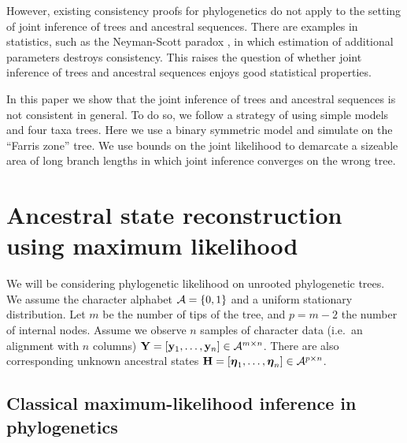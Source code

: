 \documentclass[a4paper]{article}
\begin{document}
However, existing consistency proofs for phylogenetics \cite{RoyChoudhury2015-ta} do not apply to the setting of joint inference of trees and ancestral sequences.
There are examples in statistics, such as the Neyman-Scott paradox \cite{Neyman1948-tt}, in which estimation of additional parameters destroys consistency.
This raises the question of whether joint inference of trees and ancestral sequences enjoys good statistical properties.

In this paper we show that the joint inference of trees and ancestral sequences is not consistent in general.
To do so, we follow a strategy of using simple models and four taxa trees.
Here we use a binary symmetric model and simulate on the ``Farris zone'' \cite{Siddall1998-hq} tree.
We use bounds on the joint likelihood to demarcate a sizeable area of long branch lengths in which joint inference converges on the wrong tree.

\section{Ancestral state reconstruction using maximum likelihood}

We will be considering phylogenetic likelihood on unrooted phylogenetic trees.
We assume the character alphabet $\mathcal{A}=\{0,1\}$ and a uniform stationary distribution.
Let $m$ be the number of tips of the tree, and $p = m-2$ the number of internal nodes.
Assume we observe $n$ samples of character data (i.e.\ an alignment with $n$ columns) $\mathbf{Y}=[\mathbf{y}_1,\ldots,\mathbf{y}_n]\in\mathcal{A}^{m\times n}$.
There are also corresponding unknown ancestral states $\mathbf{H}=[\boldsymbol\eta_1,\ldots,\boldsymbol\eta_n]\in\mathcal{A}^{p\times n}$.

\subsection{Classical maximum-likelihood inference in phylogenetics}
\end{document}
